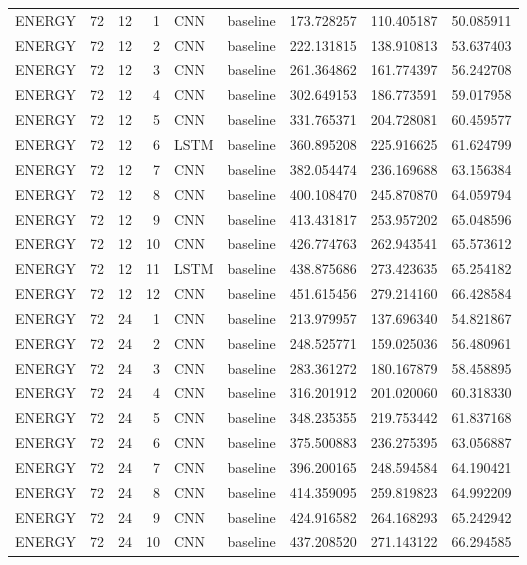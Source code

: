 \begin{table}
\begin{tabular}{lrrrllrrr}
ENERGY & 72 & 12 & 1 & CNN & baseline & 173.728257 & 110.405187 & 50.085911 \\
ENERGY & 72 & 12 & 2 & CNN & baseline & 222.131815 & 138.910813 & 53.637403 \\
ENERGY & 72 & 12 & 3 & CNN & baseline & 261.364862 & 161.774397 & 56.242708 \\
ENERGY & 72 & 12 & 4 & CNN & baseline & 302.649153 & 186.773591 & 59.017958 \\
ENERGY & 72 & 12 & 5 & CNN & baseline & 331.765371 & 204.728081 & 60.459577 \\
ENERGY & 72 & 12 & 6 & LSTM & baseline & 360.895208 & 225.916625 & 61.624799 \\
ENERGY & 72 & 12 & 7 & CNN & baseline & 382.054474 & 236.169688 & 63.156384 \\
ENERGY & 72 & 12 & 8 & CNN & baseline & 400.108470 & 245.870870 & 64.059794 \\
ENERGY & 72 & 12 & 9 & CNN & baseline & 413.431817 & 253.957202 & 65.048596 \\
ENERGY & 72 & 12 & 10 & CNN & baseline & 426.774763 & 262.943541 & 65.573612 \\
ENERGY & 72 & 12 & 11 & LSTM & baseline & 438.875686 & 273.423635 & 65.254182 \\
ENERGY & 72 & 12 & 12 & CNN & baseline & 451.615456 & 279.214160 & 66.428584 \\
ENERGY & 72 & 24 & 1 & CNN & baseline & 213.979957 & 137.696340 & 54.821867 \\
ENERGY & 72 & 24 & 2 & CNN & baseline & 248.525771 & 159.025036 & 56.480961 \\
ENERGY & 72 & 24 & 3 & CNN & baseline & 283.361272 & 180.167879 & 58.458895 \\
ENERGY & 72 & 24 & 4 & CNN & baseline & 316.201912 & 201.020060 & 60.318330 \\
ENERGY & 72 & 24 & 5 & CNN & baseline & 348.235355 & 219.753442 & 61.837168 \\
ENERGY & 72 & 24 & 6 & CNN & baseline & 375.500883 & 236.275395 & 63.056887 \\
ENERGY & 72 & 24 & 7 & CNN & baseline & 396.200165 & 248.594584 & 64.190421 \\
ENERGY & 72 & 24 & 8 & CNN & baseline & 414.359095 & 259.819823 & 64.992209 \\
ENERGY & 72 & 24 & 9 & CNN & baseline & 424.916582 & 264.168293 & 65.242942 \\
ENERGY & 72 & 24 & 10 & CNN & baseline & 437.208520 & 271.143122 & 66.294585 \\

\end{tabular}
\end{table}
